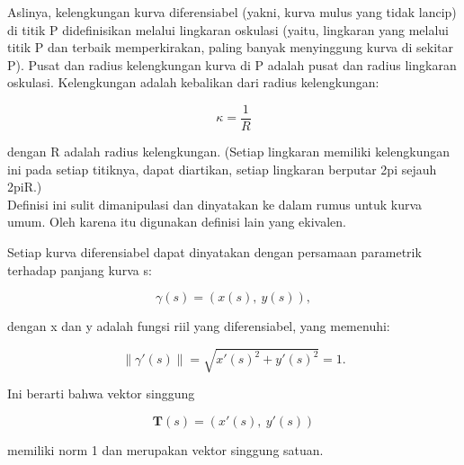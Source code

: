 \documentclass[a4paper,10pt]{article}
\begin{document}
\begin{eulernotebook}
\begin{eulercomment}
\begin{eulercomment}
\begin{eulercomment}
\begin{eulercomment}
\begin{eulercomment}
\begin{eulercomment}
\begin{eulercomment}
\begin{eulercomment}
\begin{eulercomment}
\begin{eulercomment}
\begin{eulercomment}
\begin{eulercomment}
\begin{eulercomment}
\begin{eulercomment}
\begin{eulercomment}
\begin{eulercomment}
\begin{eulercomment}
Aslinya, kelengkungan kurva diferensiabel (yakni, kurva mulus yang
tidak lancip) di titik P didefinisikan melalui lingkaran oskulasi
(yaitu, lingkaran yang melalui titik P dan terbaik memperkirakan,
paling banyak menyinggung kurva di sekitar P). Pusat dan radius
kelengkungan kurva di P adalah pusat dan radius lingkaran oskulasi.
Kelengkungan adalah kebalikan dari radius kelengkungan:

\end{eulercomment}
\begin{eulerformula}
\[
\kappa =\frac {1}{R}
\]
\end{eulerformula}
\begin{eulercomment}
dengan R adalah radius kelengkungan. (Setiap lingkaran memiliki
kelengkungan ini pada setiap titiknya, dapat diartikan, setiap
lingkaran berputar 2pi sejauh 2piR.)\\
Definisi ini sulit dimanipulasi dan dinyatakan ke dalam rumus untuk
kurva umum. Oleh karena itu digunakan definisi lain yang ekivalen.

\end{eulercomment}
\begin{eulercomment}
Setiap kurva diferensiabel dapat dinyatakan dengan persamaan
parametrik terhadap panjang kurva s:

\end{eulercomment}
\begin{eulerformula}
\[
\gamma(s) = (x(s),\ y(s)),
\]
\end{eulerformula}
\begin{eulercomment}
dengan x dan y adalah fungsi riil yang diferensiabel, yang memenuhi:

\end{eulercomment}
\begin{eulerformula}
\[
\|\gamma'(s)\|=\sqrt{x'(s)^2+y'(s)^2}=1.
\]
\end{eulerformula}
\begin{eulercomment}
Ini berarti bahwa vektor singgung


\end{eulercomment}
\begin{eulerformula}
\[
\mathbf{T}(s)=(x'(s),\ y'(s))
\]
\end{eulerformula}
\begin{eulercomment}
memiliki norm 1 dan merupakan vektor singgung satuan.


\end{eulercomment}
\end{eulercomment}
\end{eulercomment}
\end{eulercomment}
\end{eulercomment}
\end{eulercomment}
\end{eulercomment}
\end{eulercomment}
\end{eulercomment}
\end{eulercomment}
\end{eulercomment}
\end{eulercomment}
\end{eulercomment}
\end{eulercomment}
\end{eulercomment}
\end{eulercomment}
\end{eulercomment}
\end{eulernotebook}
\end{document}
